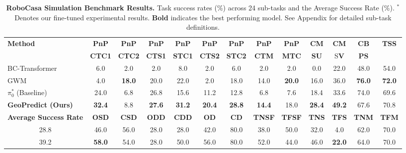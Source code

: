 \begin{table}[htbp]
\caption{\textbf{RoboCasa Simulation Benchmark Results.} Task success rates (\%) across 24 sub-tasks and the Average Success Rate (\%). $^{\bm{\ast}}$Denotes our fine-tuned experimental results. \textbf{Bold} indicates the best performing model. See Appendix for detailed sub-task definitions.}
\vspace{-5pt}
\centering
\small
\begin{tabular}{l|cccccccccccc} 
\toprule
\multirow{2}{*}{\textbf{Method}} & \textbf{PnP} & \textbf{PnP} & \textbf{PnP} & \textbf{PnP} & \textbf{PnP} & \textbf{PnP} & \textbf{PnP} & \textbf{PnP} & \textbf{CM} & \textbf{CM} & \textbf{CB} & \multirow{2}{*}{\textbf{TSS}} \\
 & \textbf{CTC1} & \textbf{CTC2} & \textbf{CTS1} & \textbf{STC1} & \textbf{CTS2} & \textbf{STC2} & \textbf{CTM} & \textbf{MTC} & \textbf{SU} & S\textbf{V} & \textbf{PS} & \\ 
\midrule

BC-Transformer~\cite{nasiriany2024robocasa}& 6.0 & 2.0 & 2.0 & 8.0 & 2.0 & 6.0 & 2.0 & 2.0 & 0.0 & 22.0 & 48.0 & 54.0 \\

GWM~\cite{lu2025gwm} & 4.0 & \textbf{18.0} & 20.0 & 22.0 & 2.0 & 18.0 & 14.0 & \textbf{20.0} & 16.0 & 36.0 & \textbf{76.0} & \textbf{72.0} \\

$\pi_0^{\bm{\ast}}$ (Baseline)~\cite{black2410pi0} & 24.0 & 6.8 & 26.8 & 15.6 & 11.2 & 12.8 & 6.8 & 7.6 & 18.4 & 33.6 & 74.0 & 69.6 \\

\textbf{GeoPredict (Ours)} & \textbf{32.4} & 8.8 & \textbf{27.6} & \textbf{31.2} & \textbf{20.4} & \textbf{28.8} & \textbf{14.4} & 18.0 & \textbf{28.4} & \textbf{49.2} & 67.6 & 70.8 \\

\midrule
\textbf{Average Success Rate} & 
\textbf{OSD} &
\textbf{CSD} &
\textbf{ODD} &
\textbf{CDD} &
\textbf{OD} &
\textbf{CD} &
\textbf{TNSF} &
\textbf{TFSF} &
\textbf{TNS} &
\textbf{TFS} &
\textbf{TNM} &
\textbf{TFM} \\
\midrule

\multicolumn{1}{c|}{28.8} & 46.0 & 56.0 & 28.0 & 28.0 & 42.0 & 80.0 & 38.0 & 50.0 & 32.0 & 4.0 & 62.0 & 70.0\\

\multicolumn{1}{c|}{39.2} & \textbf{58.0} & 54.0 & 28.0 & 50.0 & 56.0 & 80.0 & 52.0 & 44.0 & 46.0 & \textbf{22.0} & 64.0 & 70.0\\


\end{tabular}
\end{table}
